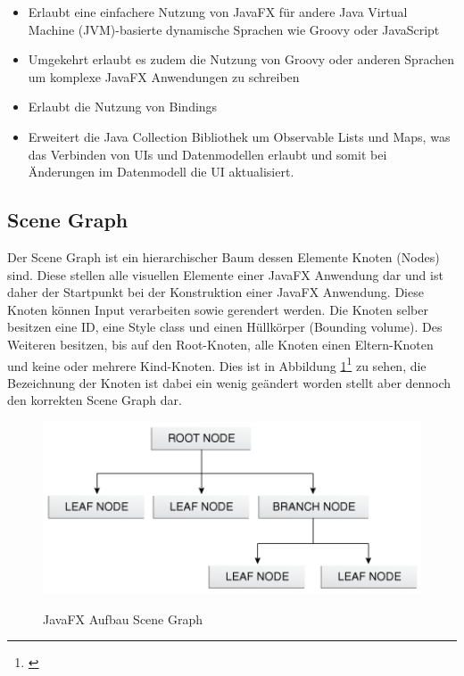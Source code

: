 \begin{itemize}
	\item Erlaubt eine einfachere Nutzung von JavaFX für andere Java Virtual Machine (JVM)-basierte dynamische Sprachen wie Groovy oder JavaScript
	\item Umgekehrt erlaubt es zudem die Nutzung von Groovy oder anderen Sprachen um komplexe JavaFX Anwendungen zu schreiben
	\item Erlaubt die Nutzung von Bindings
	\item Erweitert die Java Collection Bibliothek um Observable Lists und Maps, was das Verbinden von UIs und Datenmodellen erlaubt und somit bei Änderungen im Datenmodell die UI aktualisiert.
\end{itemize}


\subsection{Scene Graph}

Der Scene Graph ist ein hierarchischer Baum dessen Elemente Knoten (Nodes) sind. Diese stellen alle visuellen Elemente einer JavaFX Anwendung dar und ist daher der Startpunkt bei der Konstruktion einer JavaFX Anwendung. Diese Knoten können Input verarbeiten sowie gerendert werden. Die Knoten selber besitzen eine ID, eine Style class und einen Hüllkörper (Bounding volume). Des Weiteren besitzen, bis auf den Root-Knoten, alle Knoten einen Eltern-Knoten und keine oder mehrere Kind-Knoten. Dies ist in Abbildung \ref{fig:nodesfigure}\footnote{\cite{javafxscenegraph}} zu sehen, die Bezeichnung der Knoten ist dabei ein wenig geändert worden stellt aber dennoch den korrekten Scene Graph dar.

\begin{figure}[!ht]
  \centering
    \includegraphics[width=1.0\textwidth,keepaspectratio]{images/nodesfigure.png}\\
  \caption{JavaFX Aufbau Scene Graph}
  \label{fig:nodesfigure}
\end{figure}

